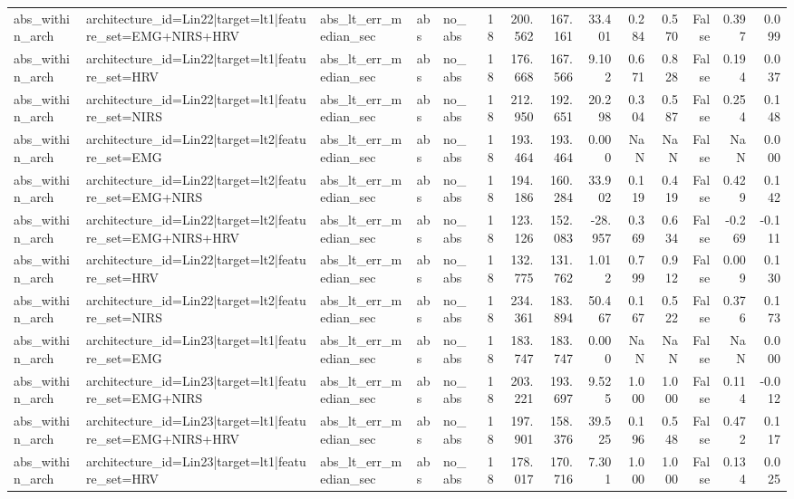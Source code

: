 \begin{table}
\begin{tabular}{lllllrrrrrrrrr}
abs_within_arch & architecture_id=Lin22|target=lt1|feature_set=EMG+NIRS+HRV & abs_lt_err_median_sec & abs & no_abs & 18 & 200.562 & 167.161 & 33.401 & 0.284 & 0.570 & False & 0.397 & 0.099 \\
abs_within_arch & architecture_id=Lin22|target=lt1|feature_set=HRV & abs_lt_err_median_sec & abs & no_abs & 18 & 176.668 & 167.566 & 9.102 & 0.671 & 0.828 & False & 0.194 & 0.037 \\
abs_within_arch & architecture_id=Lin22|target=lt1|feature_set=NIRS & abs_lt_err_median_sec & abs & no_abs & 18 & 212.950 & 192.651 & 20.298 & 0.304 & 0.587 & False & 0.254 & 0.148 \\
abs_within_arch & architecture_id=Lin22|target=lt2|feature_set=EMG & abs_lt_err_median_sec & abs & no_abs & 18 & 193.464 & 193.464 & 0.000 & NaN & NaN & False & NaN & 0.000 \\
abs_within_arch & architecture_id=Lin22|target=lt2|feature_set=EMG+NIRS & abs_lt_err_median_sec & abs & no_abs & 18 & 194.186 & 160.284 & 33.902 & 0.119 & 0.419 & False & 0.429 & 0.142 \\
abs_within_arch & architecture_id=Lin22|target=lt2|feature_set=EMG+NIRS+HRV & abs_lt_err_median_sec & abs & no_abs & 18 & 123.126 & 152.083 & -28.957 & 0.369 & 0.634 & False & -0.269 & -0.111 \\
abs_within_arch & architecture_id=Lin22|target=lt2|feature_set=HRV & abs_lt_err_median_sec & abs & no_abs & 18 & 132.775 & 131.762 & 1.012 & 0.799 & 0.912 & False & 0.009 & 0.130 \\
abs_within_arch & architecture_id=Lin22|target=lt2|feature_set=NIRS & abs_lt_err_median_sec & abs & no_abs & 18 & 234.361 & 183.894 & 50.467 & 0.167 & 0.522 & False & 0.376 & 0.173 \\
abs_within_arch & architecture_id=Lin23|target=lt1|feature_set=EMG & abs_lt_err_median_sec & abs & no_abs & 18 & 183.747 & 183.747 & 0.000 & NaN & NaN & False & NaN & 0.000 \\
abs_within_arch & architecture_id=Lin23|target=lt1|feature_set=EMG+NIRS & abs_lt_err_median_sec & abs & no_abs & 18 & 203.221 & 193.697 & 9.525 & 1.000 & 1.000 & False & 0.114 & -0.012 \\
abs_within_arch & architecture_id=Lin23|target=lt1|feature_set=EMG+NIRS+HRV & abs_lt_err_median_sec & abs & no_abs & 18 & 197.901 & 158.376 & 39.525 & 0.196 & 0.548 & False & 0.472 & 0.117 \\
abs_within_arch & architecture_id=Lin23|target=lt1|feature_set=HRV & abs_lt_err_median_sec & abs & no_abs & 18 & 178.017 & 170.716 & 7.301 & 1.000 & 1.000 & False & 0.134 & 0.025 \\

\end{tabular}
\end{table}
